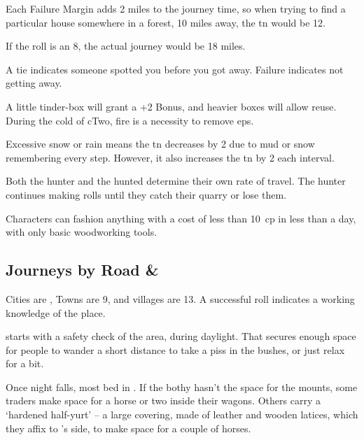 \begin{multicols}{2}
\begin{multicols}{2}
Each Failure Margin adds 2 miles to the journey time, so when trying to find a particular house somewhere in a forest, 10 miles away, the \gls{tn} would be 12.
\end{multicols}
\noindent
If the roll is an 8, the actual journey would be 18 miles.

A tie indicates someone spotted you before you got away.
Failure indicates not getting away.

A little tinder-box will grant a +2 Bonus, and heavier boxes will allow reuse.
During the cold of \gls{cTwo}, fire is a necessity to remove \glspl{ep}.

Excessive snow or rain means the \gls{tn} decreases by 2 due to mud or snow remembering every step.
However, it also increases the \gls{tn} by 2 each \gls{interval}.

Both the hunter and the hunted determine their own rate of travel.
The hunter continues making rolls until they catch their quarry or lose them.

Characters can fashion anything with a cost of less than 10~\gls{cp} in less than a day, with only basic woodworking tools.

\subsection{Journeys by Road \& }

Cities are \tn[7], Towns are 9, and \glspl{village} are 13.
A successful roll indicates a working knowledge of the place.

%
starts with a safety check of the area, during daylight.
That secures enough space for people to wander a short distance to take a piss in the bushes, or just relax for a bit.

Once night falls, most bed in .
If the \gls{bothy} hasn't the space for the mounts, some traders make space for a horse or two inside their wagons.
Others carry a `hardened half-yurt' -- a large covering, made of leather and wooden latices, which they affix to 's side, to make space for a couple of horses.


\end{multicols}
